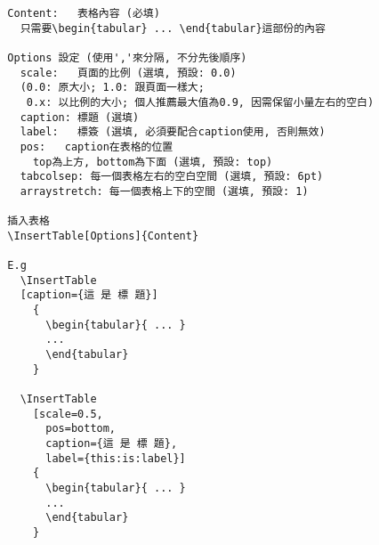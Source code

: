   \EmptyLine
  \begin{fmpage}{\textwidth}
  \begin{verbatim}
  Content:   表格內容 (必填)
    只需要\begin{tabular} ... \end{tabular}這部份的內容

  Options 設定 (使用','來分隔, 不分先後順序)
    scale:   頁面的比例 (選填, 預設: 0.0)
    (0.0: 原大小; 1.0: 跟頁面一樣大;
     0.x: 以比例的大小; 個人推薦最大值為0.9, 因需保留小量左右的空白)
    caption: 標題 (選填)
    label:   標簽 (選填, 必須要配合caption使用, 否則無效)
    pos:   caption在表格的位置
      top為上方, bottom為下面 (選填, 預設: top)
    tabcolsep: 每一個表格左右的空白空間 (選填, 預設: 6pt)
    arraystretch: 每一個表格上下的空間 (選填, 預設: 1)

  插入表格
  \InsertTable[Options]{Content}

  E.g
    \InsertTable
    [caption={這 是 標 題}]
      {
        \begin{tabular}{ ... }
        ...
        \end{tabular}
      }

    \InsertTable
      [scale=0.5,
        pos=bottom,
        caption={這 是 標 題},
        label={this:is:label}]
      {
        \begin{tabular}{ ... }
        ...
        \end{tabular}
      }
  \end{verbatim}
  \end{fmpage}


